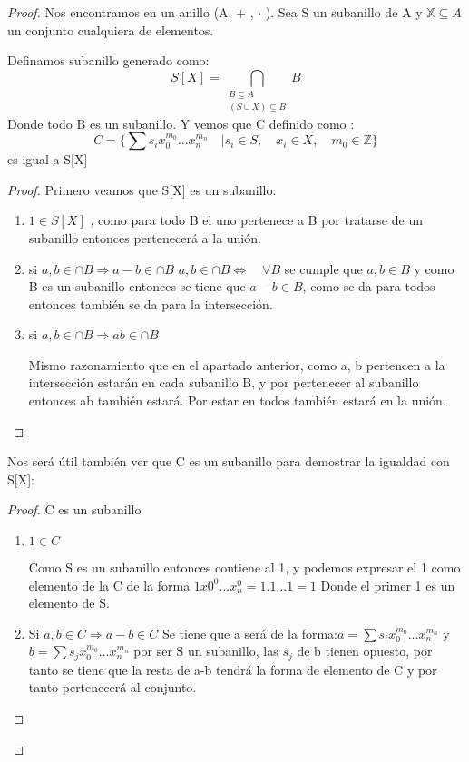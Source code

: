 \begin{proof}
Nos encontramos en un anillo (A, + , $\cdot$ ). Sea S un subanillo de A y $\mathds{X} \subseteq A$ un conjunto cualquiera de elementos.

Definamos subanillo generado como:
$$ S[X] = \bigcap_{ \substack{ B \subseteq  A \\ (S \cup X) \subseteq B}} B $$ Donde todo B es un subanillo.
Y vemos que C definido como :  $$ C = \{ \sum s_i x_{0}^{m_0} ...x_{n}^{m_n} \quad | s_i \in S, \quad x_i \in X,  \quad  m_0 \in \mathds{Z} \} $$ es igual a S[X]
	\begin{proof}
	Primero veamos que S[X] es un subanillo:
	\begin{enumerate}
	\item $ 1 \in S[X]$ , como para todo B el uno pertenece a B por tratarse de un subanillo entonces pertenecerá a la unión.
	\item si $a,b \in \cap B \Rightarrow a-b \in \cap B$
$ a,b \in \cap B \Leftrightarrow \quad \forall B$ se cumple que $a,b \in B$ y como B es un subanillo entonces se tiene que $a-b \in B$, como se da para
todos entonces también se da para la intersección.
	\item si $a,b \in \cap B \Rightarrow ab \in \cap B$

	Mismo razonamiento que en el apartado anterior, como a, b pertencen a la intersección estarán en cada subanillo B, y por pertenecer al subanillo entonces ab también estará.
	Por estar en todos también estará en la unión.
	\end{enumerate}
	\end{proof}

	Nos será útil también ver que C es un subanillo para demostrar la igualdad con S[X]:
	\begin{proof}
	C es un subanillo

	\begin{enumerate}
	\item $1 \in C$

	Como S es un subanillo entonces contiene al 1, y podemos expresar el 1 como elemento de la C de la forma $1 x0^0...x_n^0 = 1.1...1 = 1$  Donde el primer 1 es un elemento de S.

	\item Si $a,b \in C \Rightarrow a-b \in C $
Se tiene que a será de la forma:$ a= \sum s_i x_{0}^{m_0} ...x_{n}^{m_n} $ y $b=\sum s_j x_{0}^{m_0} ...x_{n}^{m_n} $ por ser S un subanillo, las $s_j$ de b tienen opuesto, por tanto se tiene que la resta de a-b tendrá la forma de elemento de C y por tanto pertenecerá al conjunto.


\end{enumerate}
\end{proof}
\end{proof}
